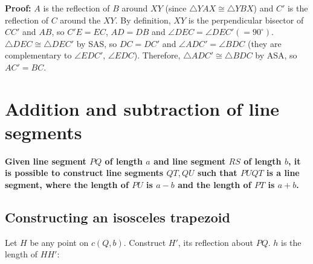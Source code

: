 \textbf{Proof:} $A$ is the reflection of $B$ around $XY$ (since $\triangle YAX\cong \triangle YBX$) and $C'$ is the reflection of $C$ around the $XY$. By definition, $XY$ is the perpendicular bisector of $CC'$ and $AB$, so $C'E=EC$, $AD=DB$ and $\angle DEC=\angle DEC'(=90^\circ)$. $\triangle DEC\cong\triangle DEC'$ by SAS, so $DC=DC'$ and $\angle ADC'=\angle BDC$ (they are complementary to $\angle EDC'$, $\angle EDC$). Therefore, $\triangle ADC'\cong\triangle BDC$ by ASA, so $AC'=BC$.


\section{Addition and subtraction of line segments}\label{s.add-subtract}

\textbf{Given line segment $PQ$ of length $a$ and line segment $RS$ of length $b$, it is possible to construct line segments $QT,QU$ such that $PUQT$ is a line segment, where the length of $PU$ is $a-b$ and the length of $PT$ is $a+b$.}
\begin{center}
\end{center}

\newpage

\subsection*{Constructing an isosceles trapezoid}

Let $H$ be any point on $c(Q,b)$. Construct $H'$, its reflection about $PQ$. $h$ is the length of $HH'$:

\vspace{-1ex}

